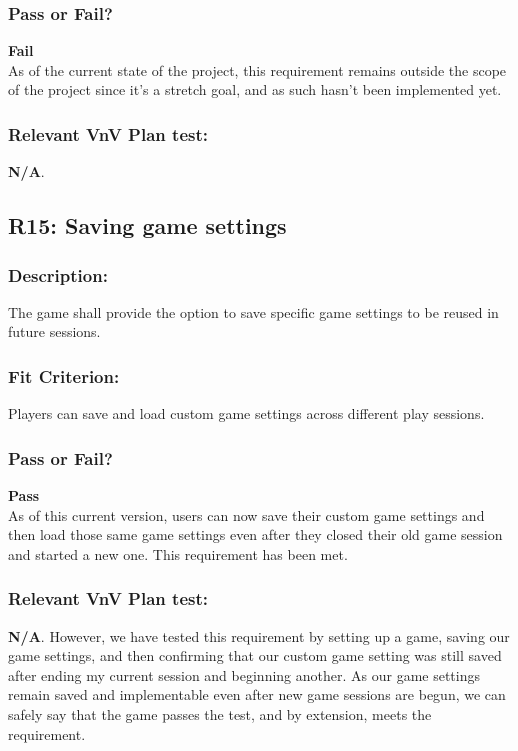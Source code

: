 \documentclass[12pt, titlepage]{article}
\begin{document}
\subsubsection{Pass or Fail?} 

 \noindent \textbf{Fail}\\
 
 \noindent As of the current state of the project, this requirement remains outside the scope of the project since it's a stretch goal, and as such hasn't been implemented yet. 

\subsubsection{Relevant VnV Plan test: } \textbf{N/A}.

\subsection{R15: Saving game settings} 

\subsubsection{Description:}The game shall provide the option to save specific game settings to be reused in future sessions.

\subsubsection{Fit Criterion:}Players can save and load custom game settings across different play sessions.


\subsubsection{Pass or Fail?} 

 \noindent \textbf{Pass}\\
 
 \noindent As of this current version, users can now save their custom game settings and then load those same game settings even after they closed their old game session and started a new one. This requirement has been met.

\subsubsection{Relevant VnV Plan test: } \textbf{N/A}. However, we have tested this requirement by setting up a game, saving our game settings, and then confirming that our custom game setting was still saved after ending my current session and beginning another. As our game settings remain saved and implementable even after new game sessions are begun, we can safely say that the game passes the test, and by extension, meets the requirement.
\end{document}
